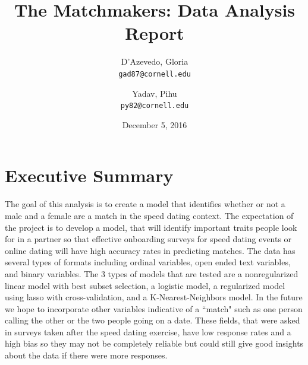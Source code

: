 \documentclass{article}
\title{The Matchmakers: Data Analysis Report}
\author{
  D'Azevedo, Gloria\\
  \texttt{gad87@cornell.edu}
  \and
  Yadav, Pihu\\
  \texttt{py82@cornell.edu}
}
\date{December 5, 2016}
\begin{document}
\maketitle

\section{Executive Summary}
The goal of this analysis is to create a model that identifies whether or not a male and a female are a match in the speed dating context. The expectation of the project is to develop a model, that will identify important traits people look for in a partner so that effective onboarding surveys for speed dating events or online dating will have high accuracy rates in predicting matches.  The data has several types of formats including ordinal variables, open ended text variables, and binary variables.  The 3 types of models that are tested are a nonregularized linear model with best subset selection, a logistic model, a regularized model using lasso with cross-validation, and a K-Nearest-Neighbors model.  In the future we hope to incorporate other variables indicative of a ``match" such as one person calling the other or the two people going on a date.  These fields, that were asked in surveys taken after the speed dating exercise, have low response rates and a high bias so they may not be completely reliable but could still give good insights about the data if there were more responses. 
\end{document}
